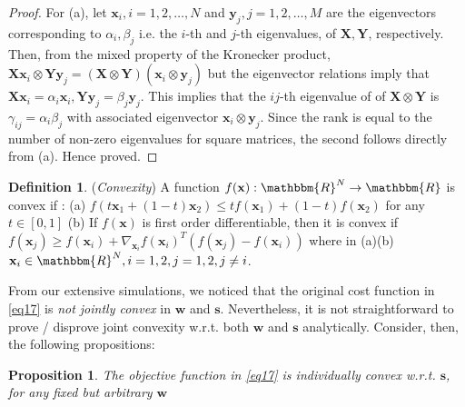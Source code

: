 \documentclass[11pt,draftclsnofoot,onecolumn]{IEEEtran}
\newtheorem{prop}{\bf{Proposition}}
\theoremstyle{definition}
\newtheorem{defn}{\bf Definition}
\theoremstyle{remark}
\begin{document}
\begin{proof}
For (a), let  $\mathbf{x}_i,i=1,2,\ldots,N$ and $\mathbf{y}_j,j=1,2,\ldots,M$ are the eigenvectors corresponding to $\alpha_i,\beta_j$ i.e. the $i$-th and $j$-th eigenvalues, of $\mathbf{X,Y}$, respectively. Then, from the mixed property of the Kronecker product, $\mathbf{X}\mathbf{x}_i\otimes\mathbf{Y}\mathbf{y}_j=(\mathbf{X}\otimes\mathbf{Y})(\mathbf{x}_i\otimes\mathbf{y}_j)$ but the eigenvector relations imply that $\mathbf{X}\mathbf{x}_i=\alpha_i\mathbf{x}_i,\mathbf{Y}\mathbf{y}_j=\beta_j\mathbf{y}_j$. This implies that the $ij$-th eigenvalue of of $\mathbf{X}\otimes\mathbf{Y}$ is  $\gamma_{ij}=\alpha_i\beta_j$ with associated eigenvector $\mathbf{x}_i\otimes\mathbf{y}_j$. Since the rank is equal to the number of non-zero eigenvalues for square matrices, the second follows directly from (a). Hence proved.
\end{proof}

\begin{defn}\label{mydef1} ({\it Convexity})
 A function $f(\mathbf{x}):\mathbbm{R}^N\rightarrow\mathbbm{R}$ is convex if : \newline
(a) $f(t \mathbf{x}_1+(1-t)\mathbf{x}_2)\leq t f(\mathbf{x}_1)+(1-t)f(\mathbf{x}_2)$ for any $t\in[0,1]$ \newline
(b) If $f(\mathbf{x})$ is first order differentiable, then it is convex if  $f(\mathbf{x}_j)\geq f(\mathbf{x}_i)+ \nabla_{\mathbf{x}_i} f(\mathbf{x}_i)^T( f(\mathbf{x}_j)-f(\mathbf{x}_i) )$\newline
where  in (a)(b) $\mathbf{x}_i\in\mathbbm{R}^N,i=1,2, j=1,2,j\neq i$.
\end{defn}

From our extensive simulations, we noticed that the original cost function in \eqref{eq17} is {\it not jointly convex} in $\mathbf{w}$ and $\mathbf{s}$. Nevertheless, it is not straightforward to prove / disprove joint convexity w.r.t. both $\mathbf{w}$ and $\mathbf{s}$ analytically. Consider, then, the following propositions:
\begin{prop} \label{propos1}
The objective function in \eqref{eq17} is individually convex w.r.t. $\mathbf{s}$, for any fixed but arbitrary $\mathbf{w}$
\end{prop}
\end{document}
